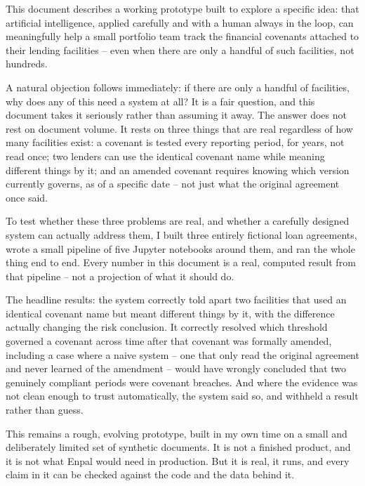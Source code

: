 \documentclass[11pt,a4paper]{article}
\begin{document}
This document describes a working prototype built to explore a specific idea: that artificial intelligence, applied carefully and with a human always in the loop, can meaningfully help a small portfolio team track the financial covenants attached to their lending facilities -- even when there are only a handful of such facilities, not hundreds.

A natural objection follows immediately: if there are only a handful of facilities, why does any of this need a system at all? It is a fair question, and this document takes it seriously rather than assuming it away. The answer does not rest on document volume. It rests on three things that are real regardless of how many facilities exist: a covenant is tested every reporting period, for years, not read once; two lenders can use the identical covenant name while meaning different things by it; and an amended covenant requires knowing which version currently governs, as of a specific date -- not just what the original agreement once said.

To test whether these three problems are real, and whether a carefully designed system can actually address them, I built three entirely fictional loan agreements, wrote a small pipeline of five Jupyter notebooks around them, and ran the whole thing end to end. Every number in this document is a real, computed result from that pipeline -- not a projection of what it should do.

The headline results: the system correctly told apart two facilities that used an identical covenant name but meant different things by it, with the difference actually changing the risk conclusion. It correctly resolved which threshold governed a covenant across time after that covenant was formally amended, including a case where a naive system -- one that only read the original agreement and never learned of the amendment -- would have wrongly concluded that two genuinely compliant periods were covenant breaches. And where the evidence was not clean enough to trust automatically, the system said so, and withheld a result rather than guess.

This remains a rough, evolving prototype, built in my own time on a small and deliberately limited set of synthetic documents. It is not a finished product, and it is not what Enpal would need in production. But it is real, it runs, and every claim in it can be checked against the code and the data behind it.

\newpage
\tableofcontents
\newpage
\end{document}
